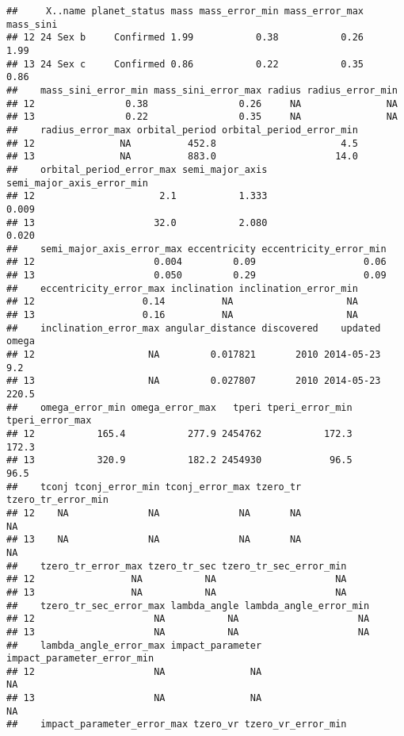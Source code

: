 \documentclass[]{article}
\begin{document}
\begin{verbatim}
##     X..name planet_status mass mass_error_min mass_error_max mass_sini
## 12 24 Sex b     Confirmed 1.99           0.38           0.26      1.99
## 13 24 Sex c     Confirmed 0.86           0.22           0.35      0.86
##    mass_sini_error_min mass_sini_error_max radius radius_error_min
## 12                0.38                0.26     NA               NA
## 13                0.22                0.35     NA               NA
##    radius_error_max orbital_period orbital_period_error_min
## 12               NA          452.8                      4.5
## 13               NA          883.0                     14.0
##    orbital_period_error_max semi_major_axis semi_major_axis_error_min
## 12                      2.1           1.333                     0.009
## 13                     32.0           2.080                     0.020
##    semi_major_axis_error_max eccentricity eccentricity_error_min
## 12                     0.004         0.09                   0.06
## 13                     0.050         0.29                   0.09
##    eccentricity_error_max inclination inclination_error_min
## 12                   0.14          NA                    NA
## 13                   0.16          NA                    NA
##    inclination_error_max angular_distance discovered    updated omega
## 12                    NA         0.017821       2010 2014-05-23   9.2
## 13                    NA         0.027807       2010 2014-05-23 220.5
##    omega_error_min omega_error_max   tperi tperi_error_min tperi_error_max
## 12           165.4           277.9 2454762           172.3           172.3
## 13           320.9           182.2 2454930            96.5            96.5
##    tconj tconj_error_min tconj_error_max tzero_tr tzero_tr_error_min
## 12    NA              NA              NA       NA                 NA
## 13    NA              NA              NA       NA                 NA
##    tzero_tr_error_max tzero_tr_sec tzero_tr_sec_error_min
## 12                 NA           NA                     NA
## 13                 NA           NA                     NA
##    tzero_tr_sec_error_max lambda_angle lambda_angle_error_min
## 12                     NA           NA                     NA
## 13                     NA           NA                     NA
##    lambda_angle_error_max impact_parameter impact_parameter_error_min
## 12                     NA               NA                         NA
## 13                     NA               NA                         NA
##    impact_parameter_error_max tzero_vr tzero_vr_error_min

\end{verbatim}
\end{document}

